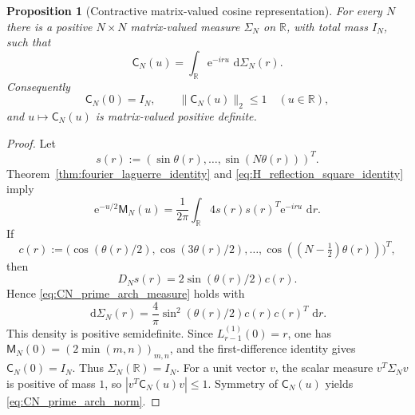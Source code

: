 \documentclass[11pt]{amsart}
\numberwithin{equation}{section}
\theoremstyle{plain}
\newtheorem{proposition}[theorem]{Proposition}
\theoremstyle{definition}
\theoremstyle{remark}
\newcommand{\e}{\mathrm e}
\newcommand{\dd}{\,\mathrm d}
\begin{document}
\begin{proposition}[Contractive matrix-valued cosine representation]
\label{prop:CN_prime_arch_contraction}
For every $N$ there is a positive $N\times N$ matrix-valued measure $\Sigma_N$ on $\mathbb R$, with total mass $I_N$, such that
\begin{equation}
 \boxed{
 \mathsf C_N(u)=\int_{\mathbb R}\e^{-iru}\,\dd\Sigma_N(r).}
 \label{eq:CN_prime_arch_measure}
\end{equation}
Consequently
\begin{equation}
 \mathsf C_N(0)=I_N,
 \qquad
 \|\mathsf C_N(u)\|_2\le1
 \quad(u\in\mathbb R),
 \label{eq:CN_prime_arch_norm}
\end{equation}
and $u\mapsto\mathsf C_N(u)$ is matrix-valued positive definite.
\end{proposition}

\begin{proof}
Let
\begin{equation*}
 s(r):=(\sin\theta(r),\ldots,\sin(N\theta(r)))^T.
\end{equation*}
Theorem~\ref{thm:fourier_laguerre_identity} and
\eqref{eq:H_reflection_square_identity} imply
\begin{equation}
 \e^{-u/2}\mathsf M_N(u)
 =\frac1{2\pi}\int_{\mathbb R}
 4s(r)s(r)^T\e^{-iru}\,\dd r.
 \label{eq:MN_rankone_fourier}
\end{equation}
If
\begin{equation*}
 c(r):=
 \bigl(\cos(\theta(r)/2),\cos(3\theta(r)/2),\ldots,
 \cos((N-\tfrac12)\theta(r))\bigr)^T,
\end{equation*}
then
\begin{equation*}
 D_Ns(r)=2\sin(\theta(r)/2)c(r).
\end{equation*}
Hence \eqref{eq:CN_prime_arch_measure} holds with
\begin{equation}
 \dd\Sigma_N(r)
 =\frac4\pi\sin^2(\theta(r)/2)c(r)c(r)^T\,\dd r.
 \label{eq:SigmaN_prime_arch_density}
\end{equation}
This density is positive semidefinite.  Since
$L_{r-1}^{(1)}(0)=r$, one has
$\mathsf M_N(0)=(2\min(m,n))_{m,n}$, and the first-difference identity gives
$\mathsf C_N(0)=I_N$.  Thus $\Sigma_N(\mathbb R)=I_N$.
For a unit vector $v$, the scalar measure $v^T\Sigma_Nv$ is positive of mass $1$, so
$|v^T\mathsf C_N(u)v|\le1$.  Symmetry of $\mathsf C_N(u)$ yields
\eqref{eq:CN_prime_arch_norm}.
\end{proof}
\end{document}
